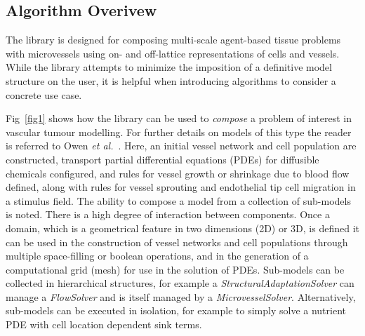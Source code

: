 \documentclass[10pt,letterpaper]{article}
\begin{document}
\subsection*{Algorithm Overivew}

The library is designed for composing multi-scale agent-based tissue problems with microvessels using on- and off-lattice representations of cells and vessels. While the library attempts to minimize the imposition of a definitive model structure on the user, it is helpful when introducing algorithms to consider a concrete use case. 

Fig~\ref{fig1} shows how the library can be used to \emph{compose} a problem of interest in vascular tumour modelling. For further details on models of this type the reader is referred to Owen \emph{et al.}~\cite{Owen2011}. Here, an initial vessel network and cell population are constructed, transport partial differential equations (PDEs) for diffusible chemicals configured, and rules for vessel growth or shrinkage due to blood flow defined, along with rules for vessel sprouting and endothelial tip cell migration in a stimulus field. The ability to compose a model from a collection of sub-models is noted. There is a high degree of interaction between components. Once a domain, which is a geometrical feature in two dimensions (2D) or 3D, is defined it can be used in the construction of vessel networks and cell populations through multiple space-filling or boolean operations, and in the generation of a computational grid (mesh) for use in the solution of PDEs. Sub-models can be collected in hierarchical structures, for example a \textit{StructuralAdaptationSolver} can manage a \textit{FlowSolver} and is itself managed by a \textit{MicrovesselSolver}. Alternatively, sub-models can be executed in isolation, for example to simply solve a nutrient PDE with cell location dependent sink terms.
\end{document}
